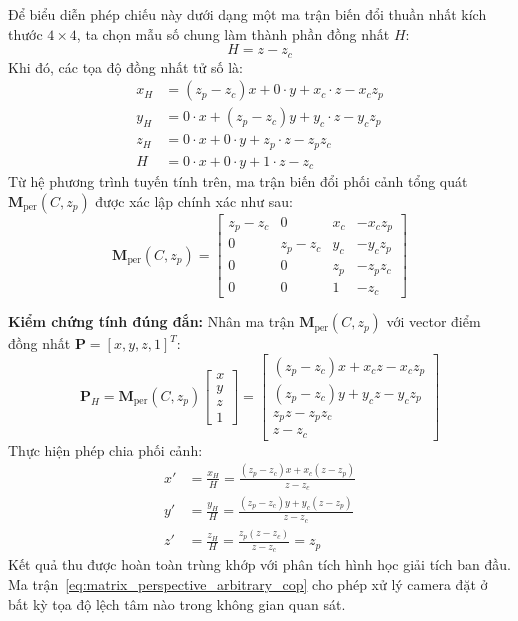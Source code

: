 Để biểu diễn phép chiếu này dưới dạng một ma trận biến đổi thuần nhất kích thước $4 \times 4$, ta chọn mẫu số chung làm thành phần đồng nhất $H$:
\begin{equation}
H = z - z_c
\end{equation}
Khi đó, các tọa độ đồng nhất tử số là:
\begin{align}
x_H &= (z_p - z_c) x + 0 \cdot y + x_c \cdot z - x_c z_p \\
y_H &= 0 \cdot x + (z_p - z_c) y + y_c \cdot z - y_c z_p \\
z_H &= 0 \cdot x + 0 \cdot y + z_p \cdot z - z_p z_c \\
H   &= 0 \cdot x + 0 \cdot y + 1 \cdot z - z_c
\end{align}
Từ hệ phương trình tuyến tính trên, ma trận biến đổi phối cảnh tổng quát $\mathbf{M}_{\text{per}}(C, z_p)$ được xác lập chính xác như sau:
\begin{equation}
\label{eq:matrix_perspective_arbitrary_cop}
\mathbf{M}_{\text{per}}(C, z_p) = \begin{bmatrix}
z_p - z_c & 0 & x_c & -x_c z_p \\
0 & z_p - z_c & y_c & -y_c z_p \\
0 & 0 & z_p & -z_p z_c \\
0 & 0 & 1 & -z_c
\end{bmatrix}
\end{equation}

\textbf{Kiểm chứng tính đúng đắn:} Nhân ma trận $\mathbf{M}_{\text{per}}(C, z_p)$ với vector điểm đồng nhất $\mathbf{P} = [x, y, z, 1]^T$:
\begin{equation}
\mathbf{P}_H = \mathbf{M}_{\text{per}}(C, z_p) \begin{bmatrix} x \\ y \\ z \\ 1 \end{bmatrix} = \begin{bmatrix}
(z_p - z_c)x + x_c z - x_c z_p \\
(z_p - z_c)y + y_c z - y_c z_p \\
z_p z - z_p z_c \\
z - z_c
\end{bmatrix}
\end{equation}
Thực hiện phép chia phối cảnh:
\begin{align}
x' &= \frac{x_H}{H} = \frac{(z_p - z_c)x + x_c(z - z_p)}{z - z_c} \\
y' &= \frac{y_H}{H} = \frac{(z_p - z_c)y + y_c(z - z_p)}{z - z_c} \\
z' &= \frac{z_H}{H} = \frac{z_p(z - z_c)}{z - z_c} = z_p
\end{align}
Kết quả thu được hoàn toàn trùng khớp với phân tích hình học giải tích ban đầu. Ma trận~\eqref{eq:matrix_perspective_arbitrary_cop} cho phép xử lý camera đặt ở bất kỳ tọa độ lệch tâm nào trong không gian quan sát.

